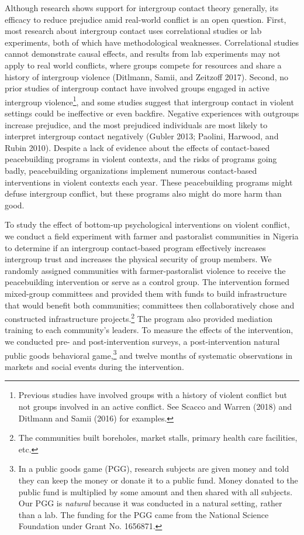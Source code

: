 \documentclass[11pt]{article}
\begin{document}
Although research shows support for intergroup contact theory generally,
its efficacy to reduce prejudice amid real-world conflict is an open
question. First, most research about intergroup contact uses
correlational studies or lab experiments, both of which have
methodological weaknesses. Correlational studies cannot demonstrate
causal effects, and results from lab experiments may not apply to real
world conflicts, where groups compete for resources and share a history
of intergroup violence (Ditlmann, Samii, and Zeitzoff 2017). Second, no
prior studies of intergroup contact have involved groups engaged in
active intergroup violence\footnote{Previous studies have involved
  groups with a history of violent conflict but not groups involved in
  an active conflict. See Scacco and Warren (2018) and Ditlmann and
  Samii (2016) for examples.}, and some studies suggest that intergroup
contact in violent settings could be ineffective or even backfire.
Negative experiences with outgroups increase prejudice, and the most
prejudiced individuals are most likely to interpret intergroup contact
negatively (Gubler 2013; Paolini, Harwood, and Rubin 2010). Despite a
lack of evidence about the effects of contact-based peacebuilding
programs in violent contexts, and the risks of programs going badly,
peacebuilding organizations implement numerous contact-based
interventions in violent contexts each year. These peacebuilding
programs might defuse intergroup conflict, but these programs also might
do more harm than good.

To study the effect of bottom-up psychological interventions on violent
conflict, we conduct a field experiment with farmer and pastoralist
communities in Nigeria to determine if an intergroup contact-based
program effectively increases intergroup trust and increases the
physical security of group members. We randomly assigned communities
with farmer-pastoralist violence to receive the peacebuilding
intervention or serve as a control group. The intervention formed
mixed-group committees and provided them with funds to build
infrastructure that would benefit both communities; committees then
collaboratively chose and constructed infrastructure projects.\footnote{The
  communities built boreholes, market stalls, primary health care
  facilities, etc.} The program also provided mediation training to each
community's leaders. To measure the effects of the intervention, we
conducted pre- and post-intervention surveys, a post-intervention
natural public goods behavioral game,\footnote{In a public goods game
  (PGG), research subjects are given money and told they can keep the
  money or donate it to a public fund. Money donated to the public fund
  is multiplied by some amount and then shared with all subjects. Our
  PGG is \emph{natural} because it was conducted in a natural setting,
  rather than a lab. The funding for the PGG came from the National
  Science Foundation under Grant No. 1656871.} and twelve months of
systematic observations in markets and social events during the
intervention.
\end{document}
